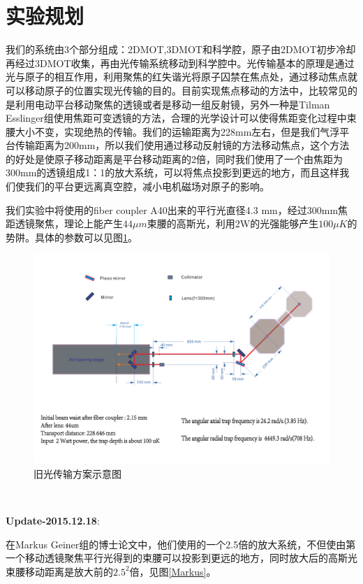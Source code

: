 \documentclass[onecolumn,a4paper,10pt]{article}
\begin{document}
\section{实验规划}
我们的系统由3个部分组成：2DMOT,3DMOT和科学腔，原子由2DMOT初步冷却再经过3DMOT收集，再由光传输系统移动到科学腔中。光传输基本的原理是通过光与原子的相互作用，利用聚焦的红失谐光将原子囚禁在焦点处，通过移动焦点就可以移动原子的位置实现光传输的目的。目前实现焦点移动的方法中，比较常见的是利用电动平台移动聚焦的透镜或者是移动一组反射镜，另外一种是Tilman Esslinger组使用焦距可变透镜的方法\cite{TTrans}，合理的光学设计可以使得焦距变化过程中束腰大小不变，实现绝热的传输。我们的运输距离为228mm左右，但是我们气浮平台传输距离为200mm，所以我们使用通过移动反射镜的方法移动焦点，这个方法的好处是使原子移动距离是平台移动距离的2倍，同时我们使用了一个由焦距为300mm的透镜组成1：1的放大系统，可以将焦点投影到更远的地方，而且这样我们使我们的平台更远离真空腔，减小电机磁场对原子的影响。

我们实验中将使用的fiber coupler A40出来的平行光直径4.3 mm，经过300mm焦距透镜聚焦，理论上能产生$44\mu m$束腰的高斯光，利用2W的光强能够产生$100 \mu K$的势阱。具体的参数可以见图\ref{opticaltransfer}。

\begin{figure}[htbp]
\centering
\includegraphics[width=5in]{opticaltransfer.pdf}
\caption{旧光传输方案示意图}
\label{opticaltransfer}
\end{figure}

~\

\textbf{Update-2015.12.18}:

在Markus Geiner组的博士论文\cite{MarkusTrans}中，他们使用的一个2.5倍的放大系统，不但使由第一个移动透镜聚焦平行光得到的束腰可以投影到更远的地方，同时放大后的高斯光束腰移动距离是放大前的$2.5^{2}$倍，见图\ref{Markus}。
\end{document}
